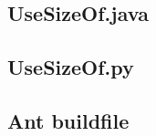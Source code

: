 \documentclass[12pt,letterpaper]{article}
\begin{document}
			\subsection{UseSizeOf.java}
				
			\subsection{UseSizeOf.py}
				
			\subsection{Ant buildfile}
				
\end{document}
